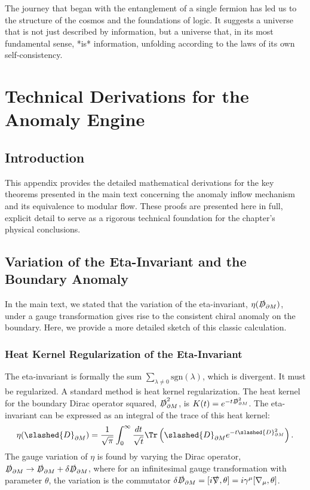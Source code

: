 \documentclass[11pt, letterpaper]{report}
\theoremstyle{plain} %
\theoremstyle{definition} %
\theoremstyle{remark} %
\newcommand{\BulkM}{M}
\newcommand{\BoundaryM}{\partial\BulkM}
\newcommand{\DiracOpBoundary}{\slashed{D}_{\BoundaryM}}
\newcommand{\EtaInv}{\eta}
\begin{document}
The journey that began with the entanglement of a single fermion has led us to the structure of the cosmos and the foundations of logic. It suggests a universe that is not just described by information, but a universe that, in its most fundamental sense, *is* information, unfolding according to the laws of its own self-consistency.




\appendix
\chapter{Technical Derivations for the Anomaly Engine}
\label{app:anomaly_engine_derivations}

\section{Introduction}

This appendix provides the detailed mathematical derivations for the key theorems presented in the main text concerning the anomaly inflow mechanism and its equivalence to modular flow. These proofs are presented here in full, explicit detail to serve as a rigorous technical foundation for the chapter's physical conclusions.

\section{Variation of the Eta-Invariant and the Boundary Anomaly}
\label{app:eta_variation}

In the main text, we stated that the variation of the eta-invariant, $\EtaInv(\DiracOpBoundary)$, under a gauge transformation gives rise to the consistent chiral anomaly on the boundary. Here, we provide a more detailed sketch of this classic calculation.

\subsection{Heat Kernel Regularization of the Eta-Invariant}
The eta-invariant is formally the sum $\sum_{\lambda \neq 0} \text{sgn}(\lambda)$, which is divergent. It must be regularized. A standard method is heat kernel regularization. The heat kernel for the boundary Dirac operator squared, $\DiracOpBoundary^2$, is $K(t) = e^{-t\DiracOpBoundary^2}$. The eta-invariant can be expressed as an integral of the trace of this heat kernel:
\begin{equation}
    \EtaInv(\DiracOpBoundary) = \frac{1}{\sqrt{\pi}} \int_0^\infty \frac{dt}{\sqrt{t}} \Tr\left(\DiracOpBoundary e^{-t\DiracOpBoundary^2}\right).
\end{equation}
The gauge variation of $\EtaInv$ is found by varying the Dirac operator, $\DiracOpBoundary \to \DiracOpBoundary + \delta\DiracOpBoundary$, where for an infinitesimal gauge transformation with parameter $\theta$, the variation is the commutator $\delta\DiracOpBoundary = [i\slashed{\nabla}, \theta] = i\gamma^\mu[\nabla_\mu, \theta]$.
\end{document}
